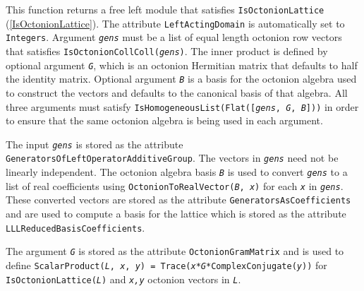 \documentclass[a4paper,11pt]{report}
\begin{document}
{{{ This function returns a free left module that satisfies \texttt{IsOctonionLattice} (\ref{IsOctonionLattice}). The attribute \texttt{LeftActingDomain} is automatically set to \texttt{Integers}. Argument \mbox{\texttt{\mdseries\slshape gens}} must be a list of equal length octonion row vectors that satisfies \texttt{IsOctonionCollColl(\mbox{\texttt{\mdseries\slshape gens}})}. The inner product is defined by optional argument \mbox{\texttt{\mdseries\slshape G}}, which is an octonion Hermitian matrix that defaults to half the identity
matrix. Optional argument \mbox{\texttt{\mdseries\slshape B}} is a basis for the octonion algebra used to construct the vectors and defaults
to the canonical basis of that algebra. All three arguments must satisfy \texttt{IsHomogeneousList(Flat([\mbox{\texttt{\mdseries\slshape gens}}, \mbox{\texttt{\mdseries\slshape G}}, \mbox{\texttt{\mdseries\slshape B}}]))} in order to ensure that the same octonion algebra is being used in each
argument. 

 The input \mbox{\texttt{\mdseries\slshape gens}} is stored as the attribute \texttt{GeneratorsOfLeftOperatorAdditiveGroup}. The vectors in \mbox{\texttt{\mdseries\slshape gens}} need not be linearly independent. The octonion algebra basis \mbox{\texttt{\mdseries\slshape B}} is used to convert \mbox{\texttt{\mdseries\slshape gens}} to a list of real coefficients using \texttt{OctonionToRealVector(\mbox{\texttt{\mdseries\slshape B}}, \mbox{\texttt{\mdseries\slshape x}})} for each \mbox{\texttt{\mdseries\slshape x}} in \mbox{\texttt{\mdseries\slshape gens}}. These converted vectors are stored as the attribute \texttt{GeneratorsAsCoefficients} and are used to compute a basis for the lattice which is stored as the
attribute \texttt{ LLLReducedBasisCoefficients}. 

 The argument \mbox{\texttt{\mdseries\slshape G}} is stored as the attribute \texttt{OctonionGramMatrix} and is used to define \texttt{ScalarProduct(\mbox{\texttt{\mdseries\slshape L}}, \mbox{\texttt{\mdseries\slshape x}}, \mbox{\texttt{\mdseries\slshape y}}) = Trace(\mbox{\texttt{\mdseries\slshape x}}*\mbox{\texttt{\mdseries\slshape G}}*ComplexConjugate(\mbox{\texttt{\mdseries\slshape y}}))} for \texttt{IsOctonionLattice(\mbox{\texttt{\mdseries\slshape L}})} and \mbox{\texttt{\mdseries\slshape x,y}} octonion vectors in \mbox{\texttt{\mdseries\slshape L}}. 

}}}
\end{document}

